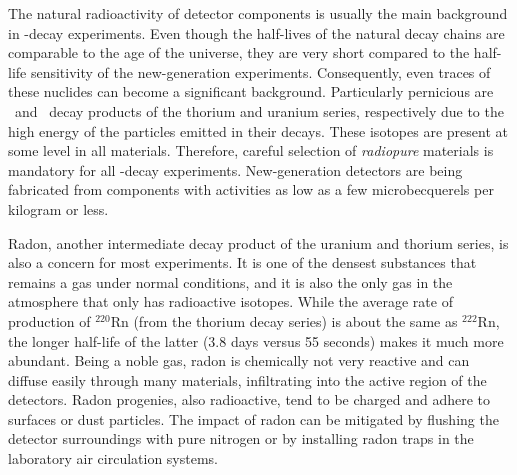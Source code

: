 \documentclass{PoS}
\begin{document}
The natural radioactivity of detector components is usually the main background in \bbonu-decay experiments. Even though the half-lives of the natural decay chains are comparable to the age of the universe, they are very short compared to the half-life sensitivity of the new-generation experiments. Consequently, even traces of these nuclides can become a significant background. Particularly pernicious are \TL\ and \BI\  decay products of the thorium and uranium series, respectively  due to the high energy of the particles emitted in their decays. These isotopes are present at some level in all materials. Therefore, careful selection of \emph{radiopure} materials is mandatory for all \bbonu-decay experiments. New-generation detectors are being fabricated from components with activities as low as a few microbecquerels per kilogram or less.

Radon, another intermediate decay product of the uranium and thorium series, is also a concern for most experiments. It is one of the densest substances that remains a gas under normal conditions, and it is also the only gas in the atmosphere that only has radioactive isotopes. While the average rate of production of $^{220}$Rn (from the thorium decay series) is about the same as $^{222}$Rn, the longer half-life of the latter (3.8 days versus 55 seconds) makes it much more abundant. Being a noble gas, radon is chemically not very reactive and can diffuse easily through many materials, infiltrating into the active region of the detectors. Radon progenies, also radioactive, tend to be charged and adhere to surfaces or dust particles.  The impact of radon can be mitigated by flushing the detector surroundings with pure nitrogen or by installing radon traps in the laboratory air circulation systems. 
\end{document}

